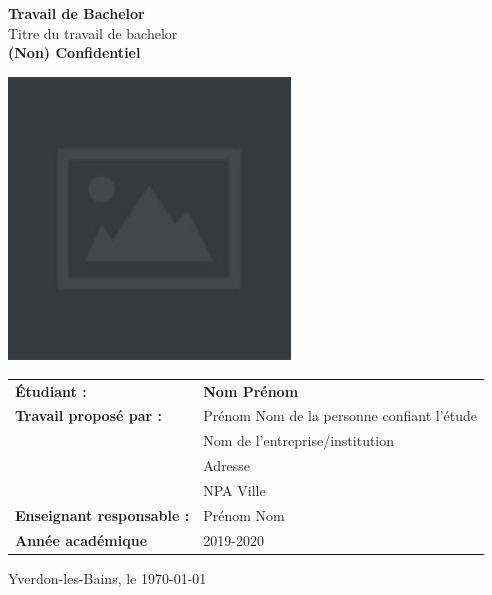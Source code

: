 \documentclass[a4paper,12pt]{report}
\begin{document}
\begin{titlepage}
\thispagestyle{firstpage}
\begin{center}

 \vspace{1.5cm}

{\huge \bfseries Travail de Bachelor \\[0.8cm] }
{\large Titre du travail de bachelor \\[0.2cm] }
{\large \bfseries (Non) Confidentiel}

\vspace{1.0cm}

\includegraphics[height=7.5cm]{sample.jpg} \\

\vspace{1.2cm}

\begin{tabular}{ll}
\textbf{Étudiant :} & \textbf{Nom Prénom} \\[0.1cm]
\textbf{Travail proposé par :} & Prénom Nom de la personne confiant l’étude \\[0.1cm]
& Nom de l’entreprise/institution \\
& Adresse \\
& NPA Ville \\
\textbf{Enseignant responsable :} & Prénom Nom \\[0.1cm]
\textbf{Année académique} & 2019-2020 \\[0.1cm]
\end{tabular}

\vspace{2.0cm}

\begin{flushright}
    Yverdon-les-Bains, le \today
\end{flushright}

\end{center}

\end{titlepage}
\end{document}
